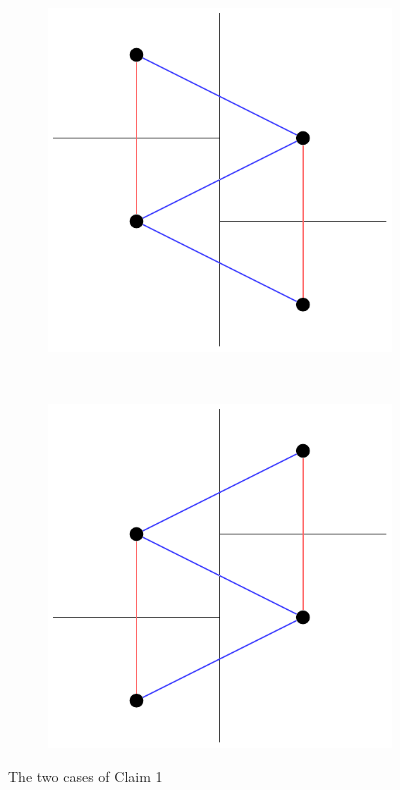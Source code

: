 \documentclass[a4paper]{article}
\begin{document}
\begin{figure}
    \centering
    \begin{subfigure}[b]{0.45\textwidth}
        \includegraphics[width=\textwidth]{vertonedsidedalwaysexists1}
        \label{fig:}
    \end{subfigure}
    ~ %
    \begin{subfigure}[b]{0.45\textwidth}
        \includegraphics[width=\textwidth]{vertonedsidedalwaysexists2}
    \end{subfigure}
    \caption{ The two cases of Claim 1       \label{fig:vertonedsidedalwaysexists}
}
\end{figure}
\end{document}
